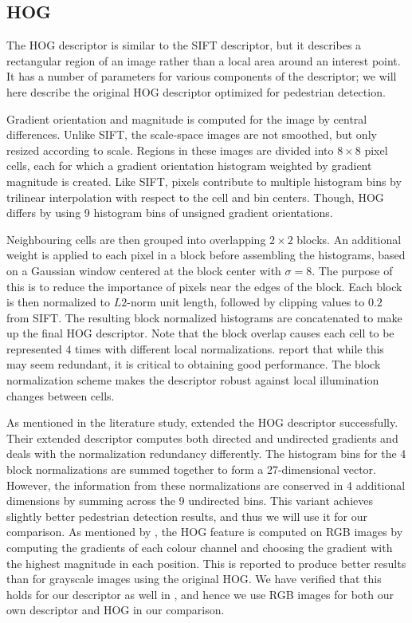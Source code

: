 \documentclass[thesis.tex]{subfiles}
\begin{document}
\subsection{HOG}
\label{sec:hog}

The HOG descriptor is similar to the SIFT descriptor, but it describes a rectangular region of an image rather than a local area around an interest point. It has a number of parameters for various components of the descriptor; we will here describe the original HOG descriptor optimized for pedestrian detection.

Gradient orientation and magnitude is computed for the image by central differences. Unlike SIFT, the scale-space images are not smoothed, but only resized according to scale. Regions in these images are divided into $8 \times 8$ pixel cells, each for which a gradient orientation histogram weighted by gradient magnitude is created. Like SIFT, pixels contribute to multiple histogram bins by trilinear interpolation with respect to the cell and bin centers. Though, HOG differs by using 9 histogram bins of unsigned gradient orientations.

Neighbouring cells are then grouped into overlapping $2 \times 2$ blocks. An additional weight is applied to each pixel in a block before assembling the histograms, based on a Gaussian window centered at the block center with $\sigma = 8$. The purpose of this is to reduce the importance of pixels near the edges of the block. Each block is then normalized to $L2$-norm unit length, followed by clipping values to $0.2$ from SIFT. The resulting block normalized histograms are concatenated to make up the final HOG descriptor. Note that the block overlap causes each cell to be represented $4$ times with different local normalizations. \citet{dalal2005histograms} report that while this may seem redundant, it is critical to obtaining good performance. The block normalization scheme makes the descriptor robust against local illumination changes between cells.

As mentioned in the literature study, \citet{felzenszwalb2009object} extended the HOG descriptor successfully. Their extended descriptor computes both directed and undirected gradients and deals with the normalization redundancy differently. The histogram bins for the 4 block normalizations are summed together to form a 27-dimensional vector. However, the information from these normalizations are conserved in 4 additional dimensions by summing across the 9 undirected bins. This variant achieves slightly better pedestrian detection results, and thus we will use it for our comparison. As mentioned by \citet{dalal2005histograms}, the HOG feature is computed on RGB images by computing the gradients of each colour channel and choosing the gradient with the highest magnitude in each position. This is reported to produce better results than for grayscale images using the original HOG. We have verified that this holds for our descriptor as well in , and hence we use RGB images for both our own descriptor and HOG in our comparison.
\end{document}

